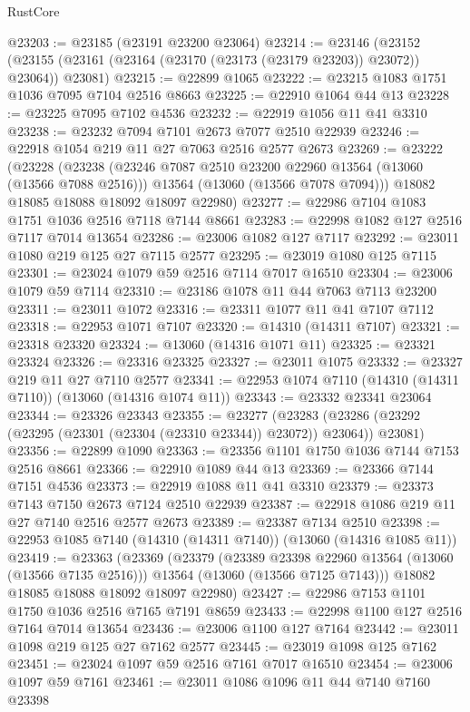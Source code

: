 \begin{lexlean}{RustCore}
\begin{coremodule}
@23203 := @23185 (@23191 @23200 @23064)
@23214 := @23146
    (@23152 (@23155 (@23161 (@23164 (@23170 (@23173 (@23179 @23203)) @23072)) @23064)) @23081)
@23215 := @22899 @1065
@23222 := @23215 @1083 @1751 @1036 @7095 @7104 @2516 @8663
@23225 := @22910 @1064 @44 @13
@23228 := @23225 @7095 @7102 @4536
@23232 := @22919 @1056 @11 @41 @3310
@23238 := @23232 @7094 @7101 @2673 @7077 @2510 @22939
@23246 := @22918 @1054 @219 @11 @27 @7063 @2516 @2577 @2673
@23269 := @23222
    (@23228
      (@23238
        (@23246 @7087 @2510 @23200 @22960 @13564 (@13060 (@13566 @7088 @2516)))
        @13564
        (@13060 (@13566 @7078 @7094)))
      @18082
      @18085
      @18088
      @18092
      @18097
      @22980)
@23277 := @22986 @7104 @1083 @1751 @1036 @2516 @7118 @7144 @8661
@23283 := @22998 @1082 @127 @2516 @7117 @7014 @13654
@23286 := @23006 @1082 @127 @7117
@23292 := @23011 @1080 @219 @125 @27 @7115 @2577
@23295 := @23019 @1080 @125 @7115
@23301 := @23024 @1079 @59 @2516 @7114 @7017 @16510
@23304 := @23006 @1079 @59 @7114
@23310 := @23186 @1078 @11 @44 @7063 @7113 @23200
@23311 := @23011 @1072
@23316 := @23311 @1077 @11 @41 @7107 @7112
@23318 := @22953 @1071 @7107
@23320 := @14310 (@14311 @7107)
@23321 := @23318 @23320
@23324 := @13060 (@14316 @1071 @11)
@23325 := @23321 @23324
@23326 := @23316 @23325
@23327 := @23011 @1075
@23332 := @23327 @219 @11 @27 @7110 @2577
@23341 := @22953 @1074 @7110 (@14310 (@14311 @7110)) (@13060 (@14316 @1074 @11))
@23343 := @23332 @23341 @23064
@23344 := @23326 @23343
@23355 := @23277
    (@23283 (@23286 (@23292 (@23295 (@23301 (@23304 (@23310 @23344)) @23072)) @23064)) @23081)
@23356 := @22899 @1090
@23363 := @23356 @1101 @1750 @1036 @7144 @7153 @2516 @8661
@23366 := @22910 @1089 @44 @13
@23369 := @23366 @7144 @7151 @4536
@23373 := @22919 @1088 @11 @41 @3310
@23379 := @23373 @7143 @7150 @2673 @7124 @2510 @22939
@23387 := @22918 @1086 @219 @11 @27 @7140 @2516 @2577 @2673
@23389 := @23387 @7134 @2510
@23398 := @22953 @1085 @7140 (@14310 (@14311 @7140)) (@13060 (@14316 @1085 @11))
@23419 := @23363
    (@23369
      (@23379
        (@23389 @23398 @22960 @13564 (@13060 (@13566 @7135 @2516)))
        @13564
        (@13060 (@13566 @7125 @7143)))
      @18082
      @18085
      @18088
      @18092
      @18097
      @22980)
@23427 := @22986 @7153 @1101 @1750 @1036 @2516 @7165 @7191 @8659
@23433 := @22998 @1100 @127 @2516 @7164 @7014 @13654
@23436 := @23006 @1100 @127 @7164
@23442 := @23011 @1098 @219 @125 @27 @7162 @2577
@23445 := @23019 @1098 @125 @7162
@23451 := @23024 @1097 @59 @2516 @7161 @7017 @16510
@23454 := @23006 @1097 @59 @7161
@23461 := @23011 @1086 @1096 @11 @44 @7140 @7160 @23398

\end{coremodule}
\end{lexlean}
